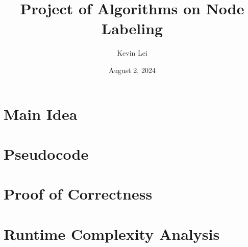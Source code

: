 \documentclass{article}
\title{Project of Algorithms on Node Labeling}
\author{Kevin Lei}
\date{August 2, 2024}
\begin{document}
\maketitle

\section{Main Idea}



\section{Pseudocode}

\begin{algorithm}[H]
\caption{}
\KwIn{}
\KwOut{}
\BlankLine

\end{algorithm}

\section{Proof of Correctness}



\section{Runtime Complexity Analysis}
\end{document}
